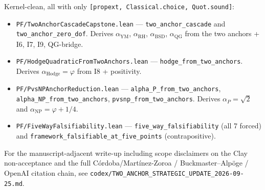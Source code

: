 Kernel-clean, all with only
\texttt{[propext, Classical.choice, Quot.sound]}:
\begin{itemize}
\item \texttt{PF/TwoAnchorCascadeCapstone.lean} ---
\texttt{two\_anchor\_cascade} and \texttt{two\_anchor\_zero\_dof}.
Derives $\alpha_{\text{YM}}$, $\alpha_{\text{RH}}$, $\alpha_{\text{BSD}}$,
$\alpha_{\text{QG}}$ from the two anchors + I6, I7, I9, QG-bridge.
\item \texttt{PF/HodgeQuadraticFromTwoAnchors.lean} ---
\texttt{hodge\_from\_two\_anchors}. Derives $\alpha_{\text{Hodge}} =
\varphi$ from I8 + positivity.
\item \texttt{PF/PvsNPAnchorReduction.lean} ---
\texttt{alpha\_P\_from\_two\_anchors},
\texttt{alpha\_NP\_from\_two\_anchors},
\texttt{pvsnp\_from\_two\_anchors}. Derives $\alpha_P = \sqrt{2}$ and
$\alpha_{\text{NP}} = \varphi + 1/4$.
\item \texttt{PF/FiveWayFalsifiability.lean} ---
\texttt{five\_way\_falsifiability} (all 7 forced) and
\texttt{framework\_falsifiable\_at\_five\_points} (contrapositive).
\end{itemize}

For the manuscript-adjacent write-up including scope disclaimers on
the Clay non-acceptance and the full C\'ordoba/Mart\'inez-Zoroa /
Buckmaster--Alp\"oge / OpenAI citation chain, see
\texttt{codex/TWO\_ANCHOR\_STRATEGIC\_UPDATE\_2026-09-25.md}.

